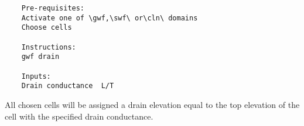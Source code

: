     \begin{verbatim}
    Pre-requisites:
    Activate one of \gwf,\swf\ or\cln\ domains
    Choose cells

    Instructions:
    gwf drain

    Inputs:
    Drain conductance  L/T
    \end{verbatim}

    All chosen cells will be assigned a drain elevation equal to the top elevation of the cell with the specified drain conductance. 